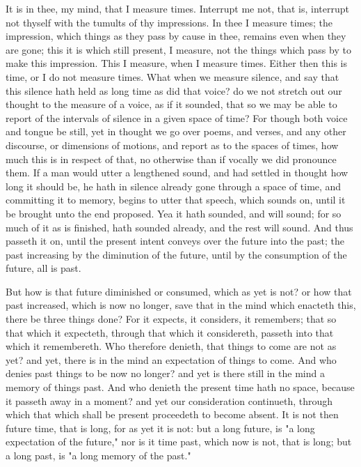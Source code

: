 \documentclass[b5paper,openright,12pt,twoside]{book}
\begin{document}
It is in thee, my mind, that I measure times. Interrupt me not, that
is, interrupt not thyself with the tumults of thy impressions. In thee
I measure times; the impression, which things as they pass by cause in
thee, remains even when they are gone; this it is which still present,
I measure, not the things which pass by to make this impression. This
I measure, when I measure times. Either then this is time, or I do not
measure times. What when we measure silence, and say that this silence
hath held as long time as did that voice? do we not stretch out our
thought to the measure of a voice, as if it sounded, that so we may be
able to report of the intervals of silence in a given space of time? For
though both voice and tongue be still, yet in thought we go over poems,
and verses, and any other discourse, or dimensions of motions, and
report as to the spaces of times, how much this is in respect of that,
no otherwise than if vocally we did pronounce them. If a man would utter
a lengthened sound, and had settled in thought how long it should be, he
hath in silence already gone through a space of time, and committing
it to memory, begins to utter that speech, which sounds on, until it be
brought unto the end proposed. Yea it hath sounded, and will sound; for
so much of it as is finished, hath sounded already, and the rest will
sound. And thus passeth it on, until the present intent conveys over
the future into the past; the past increasing by the diminution of the
future, until by the consumption of the future, all is past.

But how is that future diminished or consumed, which as yet is not? or
how that past increased, which is now no longer, save that in the mind
which enacteth this, there be three things done? For it expects, it
considers, it remembers; that so that which it expecteth, through
that which it considereth, passeth into that which it remembereth. Who
therefore denieth, that things to come are not as yet? and yet, there is
in the mind an expectation of things to come. And who denies past things
to be now no longer? and yet is there still in the mind a memory of
things past. And who denieth the present time hath no space, because it
passeth away in a moment? and yet our consideration continueth, through
which that which shall be present proceedeth to become absent. It is not
then future time, that is long, for as yet it is not: but a long future,
is "a long expectation of the future," nor is it time past, which now is
not, that is long; but a long past, is "a long memory of the past."
\end{document}
